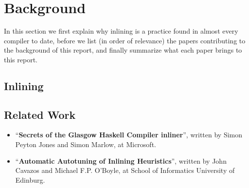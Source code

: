 
\section{Background}

In this section we first explain why inlining is a practice found in almost
every compiler to date, before we list (in order of relevance) the
papers contributing to the background of this report, and finally summarize what
each paper brings to this report.

\subsection{Inlining}

\subsection{Related Work}


\begin{itemize}
	\item ``\textbf{Secrets of the Glasgow Haskell Compiler inliner}'', written
by Simon Peyton Jones and Simon Marlow, at Microsoft. \\

	\item ``\textbf{Automatic Autotuning of Inlining Heuristics}'', written by
John Cavazos and Michael F.P. O'Boyle, at School of Informatics University of
Edinburg. \\

\end{itemize}
